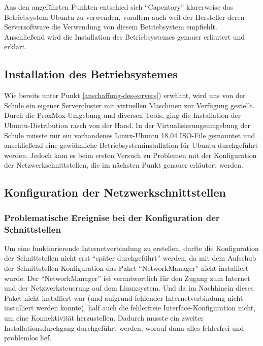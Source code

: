 Aus den angeführten Punkten entschied sich ``Capentory'' klarerweise das
Betriebsystem Ubuntu zu verwenden, vorallem auch weil der Hersteller
deren Serversoftware die Verwendung von diesem Betriebsystem empfiehlt.
Anschließend wird die Installation des Betriebsystemes genauer erläutert
und erklärt.

\hypertarget{installation-des-betriebsystemes}{%
\subsection{Installation des
Betriebsystemes}\label{installation-des-betriebsystemes}}

Wie bereits unter Punkt \ref{anschaffung-des-servers}) erwähnt, wird
uns von der Schule ein eigener Servercluster mit virtuellen Maschinen
zur Verfügung gestellt. Durch die ProxMox-Umgebung und diversen Tools,
ging die Installation der Ubuntu-Distribution rasch von der Hand. In der
Virtualisierungsumgebung der Schule musste nur ein vorhandenes
Linux-Ubuntu 18.04 ISO-File gemountet und anschließend eine gewöhnliche
Betriebsysteminstallation für Ubuntu durchgeführt werden. Jedoch kam es
beim ersten Versuch zu Problemen mit der Konfiguration der
Netzwerkschnittstellen, die im nächsten Punkt genauer erläutert werden.

\hypertarget{konfiguration-der-netzwerkschnittstellen}{%
\subsection{Konfiguration der
Netzwerkschnittstellen}\label{konfiguration-der-netzwerkschnittstellen}}

\hypertarget{problematische-ereignise-bei-der-konfiguration-der-schnittstellen}{%
\subsubsection{Problematische Ereignise bei der Konfiguration der
Schnittstellen}\label{problematische-ereignise-bei-der-konfiguration-der-schnittstellen}}

Um eine funktiorierende Internetverbindung zu erstellen, durfte die
Konfiguration der Schnittstellen nicht erst ``später durchgeführt''
werden, da mit dem Aufschub der Schnittstellen-Konfiguration das Paket
``NetworkManager'' nicht installiert wurde. Der ``NetworkManager'' ist
verantwortlich für den Zugang zum Internet und der Netzwerksteuerung auf
dem Linuxsystem. Und da im Nachhinein dieses Paket nicht installiert war
(und aufgrund fehlender Internetverbindung nicht installiert werden
konnte), half auch die fehlerfreie Interface-Konfiguration nicht, um
eine Konnektivität herzustellen. Dadurch musste ein zweiter
Installationsdurchgang durchgeführt werden, worauf dann alles fehlerfrei
und problemlos lief.

